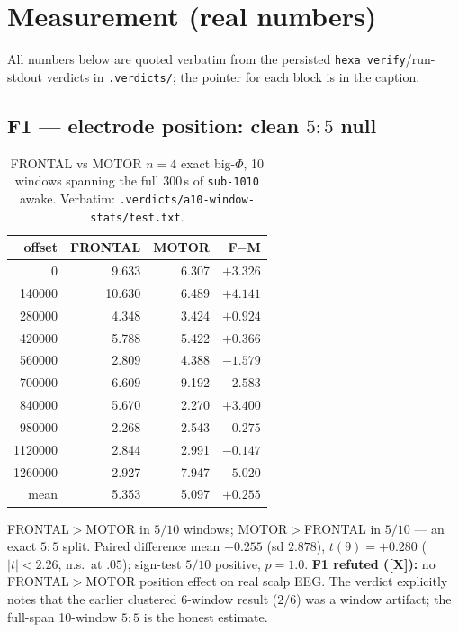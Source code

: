 \documentclass[11pt,a4paper]{article}
\providecommand{\tierRed}{\textbf{[X]}}     %
\begin{document}
\section{Measurement (real numbers)}\label{sec:measurement}

All numbers below are quoted verbatim from the persisted
\texttt{hexa verify}/run-stdout verdicts in \texttt{.verdicts/}; the pointer for
each block is in the caption.

\subsection{F1 --- electrode position: clean $5{:}5$ null}
\label{sub:f1}

\begin{table}[h]
\centering
\caption{FRONTAL vs MOTOR $n{=}4$ exact big-$\Phi$, 10 windows spanning the full
300\,s of \texttt{sub-1010} awake. Verbatim:
\texttt{.verdicts/a10-window-stats/test.txt}.}
\label{tab:f1}
\small
\begin{tabular}{@{}rrrr@{}}
\toprule
offset & FRONTAL & MOTOR & F$-$M \\
\midrule
0       & 9.633  & 6.307 & $+3.326$ \\
140000  & 10.630 & 6.489 & $+4.141$ \\
280000  & 4.348  & 3.424 & $+0.924$ \\
420000  & 5.788  & 5.422 & $+0.366$ \\
560000  & 2.809  & 4.388 & $-1.579$ \\
700000  & 6.609  & 9.192 & $-2.583$ \\
840000  & 5.670  & 2.270 & $+3.400$ \\
980000  & 2.268  & 2.543 & $-0.275$ \\
1120000 & 2.844  & 2.991 & $-0.147$ \\
1260000 & 2.927  & 7.947 & $-5.020$ \\
\midrule
mean    & 5.353  & 5.097 & $+0.255$ \\
\bottomrule
\end{tabular}
\end{table}

\noindent
FRONTAL$>$MOTOR in $5/10$ windows; MOTOR$>$FRONTAL in $5/10$ --- an exact
$5{:}5$ split. Paired difference mean $+0.255$ (sd $2.878$), $t(9){=}+0.280$
($|t|{<}2.26$, n.s.\ at $.05$); sign-test $5/10$ positive, $p{=}1.0$.
\textbf{F1 refuted (\tierRed):} no FRONTAL$>$MOTOR position effect on real scalp
EEG. The verdict explicitly notes that the earlier clustered 6-window result
($2/6$) was a window artifact; the full-span 10-window $5{:}5$ is the honest
estimate.
\end{document}
